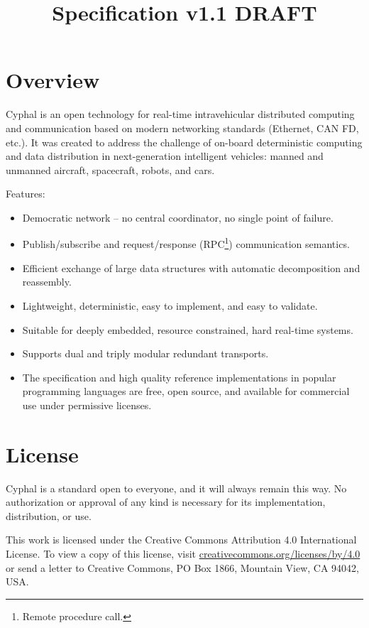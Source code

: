 \documentclass{cyphaldoc}
\title{Specification v1.1 DRAFT}
\begin{document}
\frontmatter

\begin{titlepage}

\section*{Overview}

Cyphal is an open technology for real-time intravehicular distributed computing and communication based on
modern networking standards (Ethernet, CAN FD, etc.).
It was created to address the challenge of on-board deterministic computing and data distribution in
next-generation intelligent vehicles: manned and unmanned aircraft, spacecraft, robots, and cars.

Features:

\begin{itemize}
    \item Democratic network -- no central coordinator, no single point of failure.
    \item Publish/subscribe and request/response (RPC\footnote{Remote procedure call.}) com\-mu\-ni\-ca\-tion semantics.
    \item Efficient exchange of large data structures with automatic decomposition and reassembly.
    \item Lightweight, deterministic, easy to implement, and easy to validate.
    \item Suitable for deeply embedded, resource constrained, hard real-time systems.
    \item Supports dual and triply modular redundant transports.
    \item The specification and high quality reference implementations in popular programming languages are free,
    open source, and available for commercial use under permissive licenses.
\end{itemize}

\BeginRightColumn

\section*{License}

Cyphal is a standard open to everyone, and it will always remain this way.
No authorization or approval of any kind is necessary for its implementation, distribution, or use.

This work is licensed under the Creative Commons Attribution 4.0 International License.
To view a copy of this license, visit
\href{http://creativecommons.org/licenses/by/4.0/}{creativecommons.org/licenses/by/4.0}
or send a letter to Creative Commons, PO Box 1866, Mountain View, CA 94042, USA.


\end{titlepage}
\end{document}
